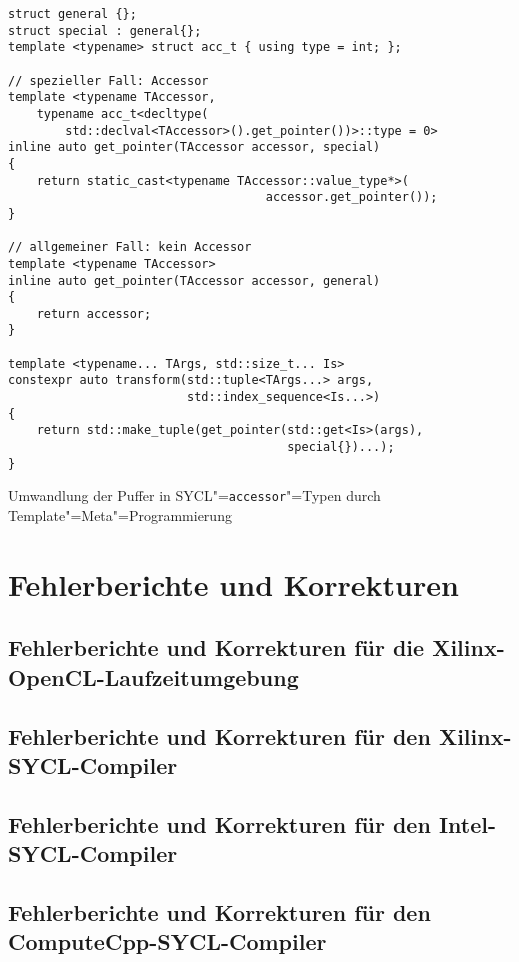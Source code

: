 \begin{code}
    \begin{verbatim}
struct general {};
struct special : general{};
template <typename> struct acc_t { using type = int; };

// spezieller Fall: Accessor
template <typename TAccessor,
    typename acc_t<decltype(
        std::declval<TAccessor>().get_pointer())>::type = 0>
inline auto get_pointer(TAccessor accessor, special)
{
    return static_cast<typename TAccessor::value_type*>(
                                    accessor.get_pointer());
}

// allgemeiner Fall: kein Accessor
template <typename TAccessor>
inline auto get_pointer(TAccessor accessor, general)
{
    return accessor;
}

template <typename... TArgs, std::size_t... Is>
constexpr auto transform(std::tuple<TArgs...> args,
                         std::index_sequence<Is...>)
{
    return std::make_tuple(get_pointer(std::get<Is>(args),
                                       special{})...);
}
    \end{verbatim}
    \caption{Umwandlung der Puffer in SYCL"=\texttt{accessor}"=Typen durch
             Template"=Meta"=Programmierung}
\end{code}

\chapter{Fehlerberichte und Korrekturen}
\label{anhang:fehler}

\section{Fehlerberichte und Korrekturen für die Xilinx-OpenCL-Laufzeitumgebung}
\label{anhang:fehler:xrt}

\section{Fehlerberichte und Korrekturen für den Xilinx-SYCL-Compiler}
\label{anhang:fehler:xilinx}

\section{Fehlerberichte und Korrekturen für den Intel-SYCL-Compiler}
\label{anhang:fehler:intel}

\section{Fehlerberichte und Korrekturen für den ComputeCpp-SYCL-Compiler}
\label{anhang:fehler:computecpp}

